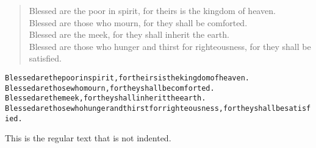 \documentclass[a4paper]{article}
\begin{document}
\begin{verse}
Blessed are the poor in spirit, for theirs is the kingdom of heaven.\\
Blessed are those who mourn, for they shall be comforted.\\
Blessed are the meek, for they shall inherit the earth.\\
Blessed are those who hunger and thirst for righteousness, for they shall be satisfied.
\end{verse}

\begin{alltt}
\textnormal{Blessed are the poor in spirit, for theirs is the kingdom of heaven.}
\textnormal{Blessed are those who mourn, for they shall be comforted.}
\textnormal{Blessed are the meek, for they shall inherit the earth.}
\textnormal{Blessed are those who hunger and thirst for righteousness, for they shall be satisfied.}
\end{alltt}

\noindent This is the regular text that is not indented.
\end{document}
